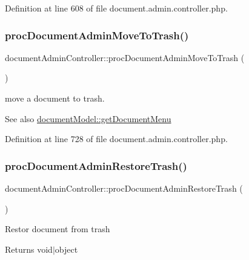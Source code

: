 Definition at line 608 of file document.\+admin.\+controller.\+php.

\mbox{\label{classdocumentAdminController_a8dfa5d37621daaba6c66732eb3568730}} 
\subsubsection{\texorpdfstring{proc\+Document\+Admin\+Move\+To\+Trash()}{procDocumentAdminMoveToTrash()}}
{\footnotesize\ttfamily document\+Admin\+Controller\+::proc\+Document\+Admin\+Move\+To\+Trash (\begin{DoxyParamCaption}{ }\end{DoxyParamCaption})}



move a document to trash. 

\begin{DoxySeeAlso}{See also}
\hyperlink{classdocumentModel_ac7c07ca7bd1c7e72f4fcacfb176097b0}{document\+Model\+::get\+Document\+Menu} 
\end{DoxySeeAlso}


Definition at line 728 of file document.\+admin.\+controller.\+php.

\mbox{\label{classdocumentAdminController_ac0467d27983d60c51c1128765244a36b}} 
\subsubsection{\texorpdfstring{proc\+Document\+Admin\+Restore\+Trash()}{procDocumentAdminRestoreTrash()}}
{\footnotesize\ttfamily document\+Admin\+Controller\+::proc\+Document\+Admin\+Restore\+Trash (\begin{DoxyParamCaption}{ }\end{DoxyParamCaption})}

Restor document from trash \begin{DoxyReturn}{Returns}
void$\vert$object 
\end{DoxyReturn}



